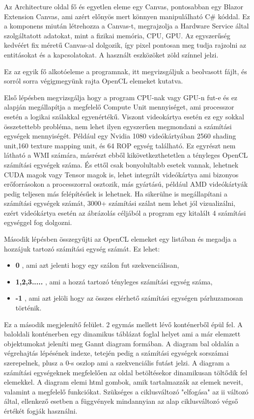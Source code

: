 Az Architecture oldal fő és egyetlen eleme egy Canvas, pontosabban egy Blazor Extension Canvas, ami azért előnyös mert könnyen manipulálható C\# kóddal. Ez a komponens miután létrehozza a Canvas-t, megrajzolja a Hardware Service által szolgáltatott adatokat, mint a fizikai memória, CPU, GPU. Az egyszerűség kedvéért fix méretű Canvas-al dolgozik, így pixel pontosan meg tudja rajzolni az entitásokat és a kapcsolatokat. A használt eszközöket zöld színnel jelzi.

Ez az egyik fő alkotóeleme a programnak, itt megvizsgáljuk a beolvasott fájlt, és sorról sorra végigmegyünk rajta OpenCL elemeket kutatva. 

Első lépésben megvizsgálja hogy a program CPU-nak vagy GPU-n fut-e és ez alapján megállapítja a megfelelő Compute Unit mennyiséget, ami processzor esetén a logikai szálakkal egyenértékű. Viszont videokártya esetén ez egy sokkal összetettebb probléma, nem lehet ilyen egyszerűen megmondani a számítási egységek mennyiségét. Például egy Nvidia 1080 videókártyában 2560 shading unit,160 texture mapping unit, és 64 ROP egység található. Ez egyrészt nem látható a WMI számára, másrészt ebből kikövetkezthetetlen a tényleges OpenCL számítási egységek száma. És ettől csak bonyolultabb esetek vannak, lehetnek CUDA magok vagy Tensor magok is, lehet integrált videókártya ami bizonyos erőforrásokon a processzorral osztozik, más gyártású, például AMD videókártyák pedig teljesen más felépítésűek is lehetnek. Ha sikerülne is megállapítani a számítási egységek számát, 3000+ számítási szálat nem lehet jól vizualizálni, ezért videókártya esetén az ábrázolás céljából a program egy kitalált 4 számítási egységgel fog dolgozni.

Második lépésben összegyűjti az OpenCL elemeket egy listában és megadja a hozzájuk tartozó számítási egység számát. Ez lehet:
\begin{itemize}
\item\textbf{0} , ami azt jelenti hogy egy szálon fut szekvenciálisan,
\item\textbf{1,2,3.....} , ami a hozzá tartozó tényleges számítási egység száma,
\item\textbf{-1} , ami azt jelöli hogy az összes elérhető számítási egységen párhuzamosan történik.
\end{itemize}

Ez a második megjelenítő felület. 2 egymás mellett lévő konténerből épül fel.
A baloldali konténerben egy dinamikus táblázat foglal helyet ami a már elemzett objektumokat jeleníti meg Gannt diagram formában. A diagram bal oldalán a végrehajtás lépésének indexe, tetején pedig a számítási egységek sorszámai szerepelnek, plusz a 0-s oszlop ami a szekvenciális futást jelzi. A diagram a számítási egységeknek megfelelően az oldal betöltésekor dinamikusan töltődik fel elemekkel. A diagram elemi html gombok, amik tartalmazzák az elemek neveit, valamint a megfelelő funkciókat. Szükséges a ciklusváltozó "elfogása" az ii változó által, ellenkező esetben a függvények mindannyian az alap ciklusváltozó végső értékét fogják használni.

